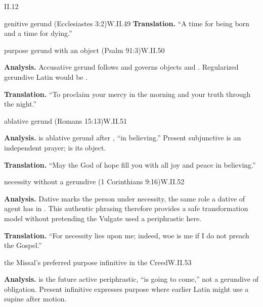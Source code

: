 \begin{courseunit}{II.12}
\begin{workedexample}{genitive gerund (Ecclesiastes 3:2)}{W.II.49}
\textbf{Translation.}  ``A time for being born and a time for dying.''
\end{workedexample}

\begin{workedexample}{purpose gerund with an object (Psalm 91:3)}{W.II.50}

\textbf{Analysis.}  Accusative gerund  follows  and governs
objects  and .  Regularized gerundive Latin would be
.

\textbf{Translation.}  ``To proclaim your mercy in the morning and your truth through the
night.''
\end{workedexample}

\begin{workedexample}{ablative gerund (Romans 15:13)}{W.II.51}

\textbf{Analysis.}   is ablative gerund after , ``in believing.''
Present subjunctive  is an independent prayer;  is its object.

\textbf{Translation.}  ``May the God of hope fill you with all joy and peace in believing.''
\end{workedexample}

\begin{workedexample}{necessity without a gerundive (1 Corinthians 9:16)}{W.II.52}

\textbf{Analysis.}  Dative  marks the person under necessity, the same role a
dative of agent has in .  This authentic phrasing therefore
provides a safe transformation model without pretending the Vulgate used a periphrastic here.

\textbf{Translation.}  ``For necessity lies upon me; indeed, woe is me if I do not preach the
Gospel.''
\end{workedexample}

\begin{workedexample}{the Missal's preferred purpose infinitive in the Creed}{W.II.53}

\textbf{Analysis.}   is the future active periphrastic, ``is going to
come,'' not a gerundive of obligation.  Present infinitive  expresses purpose
where earlier Latin might use a supine after motion.


\end{workedexample}
\end{courseunit}
